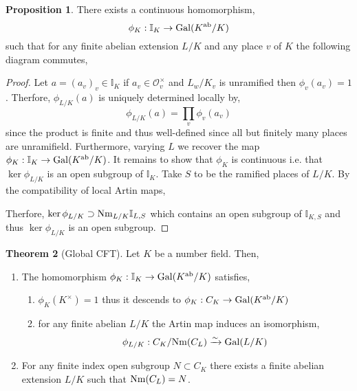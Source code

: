 \documentclass[12pt]{extarticle}
\newcommand{\ints}[1]{\mathcal{O}_{#1}}
\newcommand{\idele}[1]{\mathbb{I}_{#1}}
\newcommand{\sidele}[2]{\mathbb{I}_{#1, #2}}
\theoremstyle{definition}
\newtheorem{theorem}{Theorem}[section]
\newtheorem{proposition}[theorem]{Proposition}
\begin{document}
\newcommand{\ab}{\mathrm{ab}}

\begin{proposition}
There exists a continuous homomorphism,
\[ \phi_K : \idele{K} \to \Gal{K^{\ab} / K} \]
such that for any finite abelian extension $L / K$ and any place $v$ of $K$ the following diagram commutes,
\begin{center}
\end{center}
\end{proposition}

\begin{proof}
Let $a = (a_v)_v \in \idele{K}$ if $a_v \in \ints{v}^\times$ and $L_w / K_v$ is unramified then $\phi_v(a_v) = 1$. Therfore, $\phi_{L/K}(a)$ is uniquely determined locally by,
\[ \phi_{L/K}(a) = \prod_v \phi_v(a_v) \]
since the product is finite and thus well-defined since all but finitely many places are unramifield. Furthermore, varying $L$ we recover the map $\phi_K : \idele{K} \to \Gal{K^\ab / K}$. It remains to show that $\phi_K$ is continuous i.e. that $\ker{\phi_{L/K}}$ is an open subgroup of $\idele{K}$. Take $S$ to be the ramified places of $L/K$. By the compatibility of local Artin maps,
\begin{center}
\end{center}
Therfore, $\ker{\phi_{L/K}} \supset \Nm_{L/K}{\sidele{L}{S}}$ which contains an open subgroup of $\sidele{K}{S}$ and thus $\ker{\phi_{L/K}}$ is an open subgroup. 
\end{proof}

\begin{theorem}[Global CFT]
Let $K$ be a number field. Then,
\begin{enumerate}
\item The homomorphism $\phi_K : \idele{K} \to \Gal{K^\ab / K}$ satisfies,
\begin{enumerate}
\item $\phi_K(K^\times) = 1$ thus it descends to $\phi_K : C_K \to \Gal{K^\ab / K}$

\item for any finite abelian $L / K$ the Artin map induces an isomorphism,
\[ \phi_{L/K} : C_K / \mathrm{Nm}(C_L) \xrightarrow{\sim} \mathrm{Gal} (L/K) \]
\end{enumerate}
\item For any finite index open subgroup $N \subset C_K$ there exists a finite abelian extension $L / K$ such that $\mathrm{Nm}(C_L) = N$. 
\end{enumerate}
\end{theorem}
\end{document}

